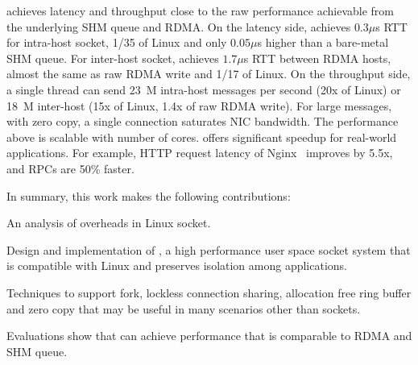 \sys{} achieves latency and throughput close to the raw performance achievable from the underlying SHM queue and RDMA.
On the latency side, \sys{} achieves $0.3\mu$s RTT for intra-host socket, 1/35 of Linux and only $0.05\mu$s higher than a bare-metal SHM queue. For inter-host socket, \sys{} achieves $1.7\mu$s RTT between RDMA hosts, almost the same as raw RDMA write and 1/17 of Linux.
On the throughput side, a single thread can send 23~M intra-host messages per second (20x of Linux) or 18~M inter-host (15x of Linux, 1.4x of raw RDMA write).
For large messages, with zero copy, a single connection saturates NIC bandwidth.
The performance above is scalable with number of cores.
\sys{} offers significant speedup for real-world applications.
For example, HTTP request latency of Nginx~\cite{nginx} improves by 5.5x, and RPCs are 50\% faster.

In summary, this work makes the following contributions:
\begin{ecompact}
	\item An analysis of overheads in Linux socket.
	\item Design and implementation of \sys{}, a high performance user space socket system that is compatible with Linux and preserves isolation among applications.
	\item Techniques to support fork, lockless connection sharing, allocation free ring buffer and zero copy that may be useful in many scenarios other than sockets.
	\item Evaluations show that \sys{} can achieve performance that is comparable to RDMA and SHM queue.
\end{ecompact}


\iffalse
This paper makes the following contributions:
\begin{ecompact}
	\item A Linux compatible, secure and high performance user-space socket system that supports both inter-process, inter-container and inter-host communication.
	\item A per-host monitor daemon for trusted control plane and peer-to-peer queues for scalable data plane.
	\item A multi-sender and multi-receiver lockless queue to fully support fork and multi-thread socket sharing.
	\item A memory efficient message queue that multiplexes multiple sockets and allows fetching from any socket, while using shared memory and RDMA transports efficiently.
\end{ecompact}
\fi